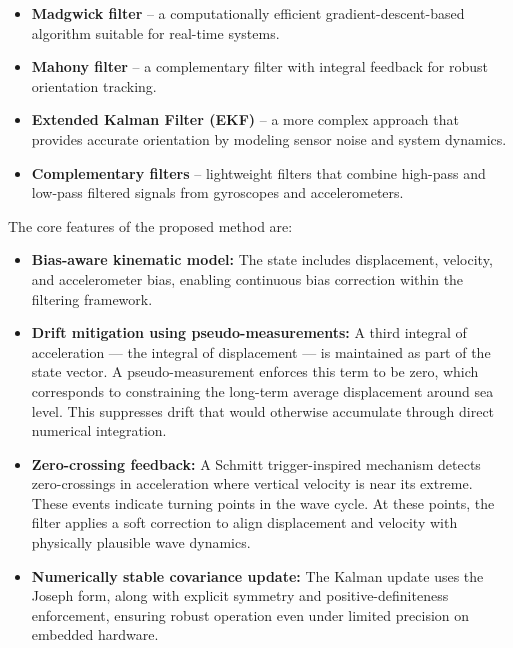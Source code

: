 \documentclass[11pt,letterpaper]{article}
\begin{document}
\begin{itemize}
\item \textbf{Madgwick\cite{madgwick2010efficient} filter} – a computationally efficient gradient-descent-based algorithm suitable for real-time systems.
\item \textbf{Mahony\cite{mahony2008nonlinear} filter} – a complementary filter with integral feedback for robust orientation tracking.
\item \textbf{Extended Kalman Filter (EKF)\cite{Markley2003,Lefferts1982}} – a more complex approach that provides accurate orientation by modeling sensor noise and system dynamics.
\item \textbf{Complementary filters} – lightweight filters that combine high-pass and low-pass filtered signals from gyroscopes and accelerometers.
\end{itemize}

The core features of the proposed method are:

\begin{itemize}
    \item \textbf{Bias-aware kinematic model:} The state includes displacement, velocity, and accelerometer bias, enabling continuous bias correction within the filtering framework.
    
    \item \textbf{Drift mitigation using pseudo-measurements:} A third integral of acceleration --- the integral of displacement --- is maintained as part of the state vector. A pseudo-measurement enforces this term to be zero, which corresponds to constraining the long-term average displacement around sea level. This suppresses drift that would otherwise accumulate through direct numerical integration.
    
    \item \textbf{Zero-crossing feedback:} A Schmitt trigger-inspired mechanism detects zero-crossings in acceleration where vertical velocity is near its extreme. These events indicate turning points in the wave cycle. At these points, the filter applies a soft correction to align displacement and velocity with physically plausible wave dynamics.
    
    \item \textbf{Numerically stable covariance update:} The Kalman update uses the Joseph\cite{grewal2014kalman} form, along with explicit symmetry and positive-definiteness enforcement, ensuring robust operation even under limited precision on embedded hardware.
\end{itemize}
\end{document}
